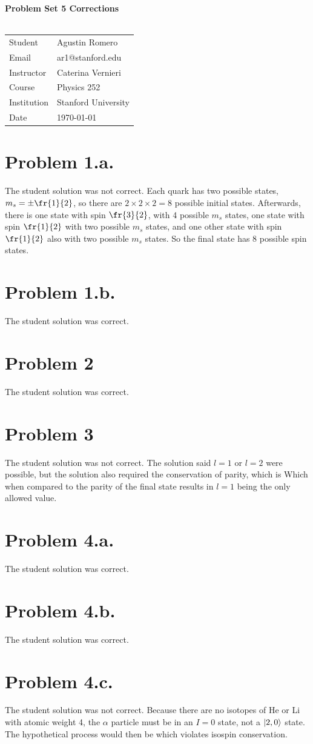 \documentclass{article}
\begin{document}
\begin{center}
\textbf{\Large{Problem Set 5 Corrections}}\\~\\
\begin{tabular}{l l}
Student&Agustin Romero\\
Email&ar1@stanford.edu\\
Instructor&Caterina Vernieri\\
Course&Physics 252\\
Institution&Stanford University\\
Date&\today\\
\end{tabular}
\end{center}
\section*{Problem 1.a.} 
The student solution was not correct. Each quark has two possible states, $m_s=\pm \fr{1}{2}$, so there are $2\times 2\times 2=8$ possible initial states. Afterwards, there is one state with spin $\fr{3}{2}$, with 4 possible $m_s$ states, one state with spin $\fr{1}{2}$ with two possible $m_s$ states, and one other state with spin $\fr{1}{2}$ also with two possible $m_s$ states. So the final state has 8 possible spin states.
\section*{Problem 1.b.} 
The student solution was correct.
\section*{Problem 2}
The student solution was correct.
\section*{Problem 3}
The student solution was not correct. The solution said $l=1$ or $l=2$ were possible, but the solution also required the conservation of parity, which is
Which when compared to the parity of the final state
results in $l=1$ being the only allowed value.
\section*{Problem 4.a.}
The student solution was correct.
\section*{Problem 4.b.}
The student solution was correct.
\section*{Problem 4.c.}
The student solution was not correct. Because there are no isotopes of He or Li with atomic weight 4, the $\alpha$ particle must be in an $I=0$ state, not a $|2,0\rangle$ state. The hypothetical process would then be
which violates isospin conservation. 
\end{document}
